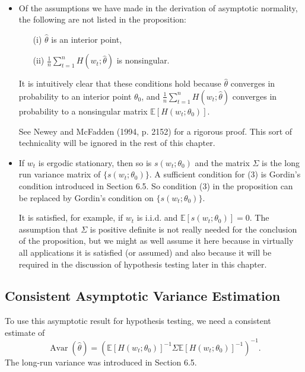 \begin{remark}
    \

    \begin{itemize}
        \item Of the assumptions we have made in the derivation of asymptotic normality, 
        the following are not listed in the proposition: 
        \begin{enumerate}
            \item[(i)] $\hat{\theta}$ is an interior point,
            \item[(ii)] $\frac{1}{n} \sum_{t=1}^n H(w_t; \hat{\theta})$ is nonsingular.
        \end{enumerate}
        It is intuitively clear that these conditions hold because $\hat{\theta}$ converges in probability to an interior point $\theta_0$, 
        and $\frac{1}{n} \sum_{t=1}^n H(w_t; \hat{\theta})$ converges in probability to a nonsingular matrix $\mathbb{E}[H(w_t; \theta_0)]$. 
        
        See Newey and McFadden (1994, p. 2152) for a rigorous proof. This sort of technicality will be ignored in the rest of this chapter.
    
        \item If $w_t$ is ergodic stationary, then so is $s(w_t; \theta_0)$ and the matrix $\Sigma$ is the long run variance matrix of $\{s(w_t; \theta_0)\}$. 
        A sufficient condition for (3) is Gordin's condition introduced in Section 6.5. 
        So condition (3) in the proposition can be replaced by Gordin's condition on $\{s(w_t; \theta_0)\}$. 
        
        It is satisfied, for example, if $w_t$ is i.i.d. and $\mathbb{E}[s(w_t; \theta_0)] = 0$. 
        The assumption that $\Sigma$ is positive definite is not really needed for the conclusion of the proposition, 
        but we might as well assume it here because in virtually all applications it is satisfied (or assumed) and also 
        because it will be required in the discussion of hypothesis testing later in this chapter.
    \end{itemize}
\end{remark}

\subsection{Consistent Asymptotic Variance Estimation}
To use this asymptotic result for hypothesis testing, we need a consistent estimate of
\[
\operatorname{Avar}(\hat{\theta}) = \left( \mathbb{E}[H(w_t; \theta_0)]^{-1} \Sigma \mathbb{E}[H(w_t; \theta_0)]^{-1} \right)^{-1}.
\]
The long-run variance was introduced in Section 6.5.

